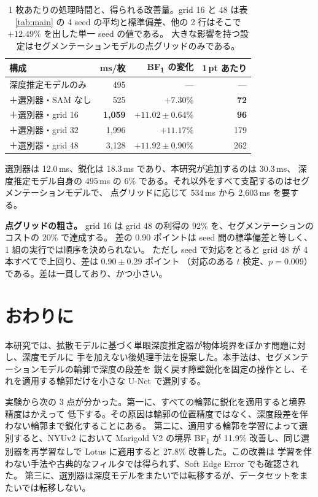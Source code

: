 \documentclass[conference]{IEEEtran}
\newcommand{\bfone}{BF\textsubscript{1}}
\begin{document}
\begin{table}[t]
\caption{1 枚あたりの処理時間と、得られる改善量。grid 16 と 48 は表 \ref{tab:main} の
4 seed の平均と標準偏差、他の 2 行はそこで $+12.49\%$ を出した単一 seed の値である。
大きな影響を持つ設定はセグメンテーションモデルの点グリッドのみである。}
\label{tab:cost}
\centering
\begin{tabular}{lrrr}
\toprule
構成 & ms/枚 & \bfone{} の変化 & 1\,pt あたり \\
\midrule
深度推定モデルのみ & 495 & --- & --- \\
＋選別器・SAM なし & 525 & $+7.30\%$ & \textbf{72} \\
＋選別器・grid 16 & \textbf{1{,}059} & $\mathbf{+11.02 \pm 0.64\%}$ & \textbf{96} \\
＋選別器・grid 32 & 1{,}996 & $+11.17\%$ & 179 \\
＋選別器・grid 48 & 3{,}128 & $+11.92 \pm 0.90\%$ & 262 \\
\bottomrule
\end{tabular}
\end{table}

選別器は 12.0\,ms、鋭化は 18.3\,ms であり、本研究が追加するのは 30.3\,ms、
深度推定モデル自身の 495\,ms の 6\% である。それ以外をすべて支配するのはセグメンテーションモデルで、
点グリッドに応じて 534\,ms から 2{,}603\,ms を要する。

\textbf{点グリッドの粗さ。} grid 16 は grid 48 の利得の 92\% を、セグメンテーションのコストの
20\% で達成する。
差の 0.90 ポイントは seed 間の標準偏差と等しく、1 組の実行では順序を決められない。
ただし seed で対応をとると grid 48 が 4 本すべてで上回り、差は $0.90 \pm 0.29$ ポイント
（対応のある $t$ 検定、$p = 0.009$）である。差は一貫しており、かつ小さい。

\section{おわりに}

本研究では、拡散モデルに基づく単眼深度推定器が物体境界をぼかす問題に対し、深度モデルに
手を加えない後処理手法を提案した。本手法は、セグメンテーションモデルの輪郭で深度の段差を
鋭く戻す障壁鋭化を固定の操作とし、それを適用する輪郭だけを小さな U-Net で選別する。

実験から次の 3 点が分かった。第一に、すべての輪郭に鋭化を適用すると境界精度はかえって
低下する。その原因は輪郭の位置精度ではなく、深度段差を伴わない輪郭まで鋭化することにある。
第二に、適用する輪郭を学習によって選別すると、NYUv2 において Marigold V2 の境界 \bfone{} が
11.9\% 改善し、同じ選別器を再学習なしで Lotus に適用すると 27.8\% 改善した。この改善は
学習を伴わない手法や古典的なフィルタでは得られず、Soft Edge Error でも確認された。
第三に、選別器は深度モデルをまたいでは転移するが、データセットをまたいでは転移しない。
\end{document}
